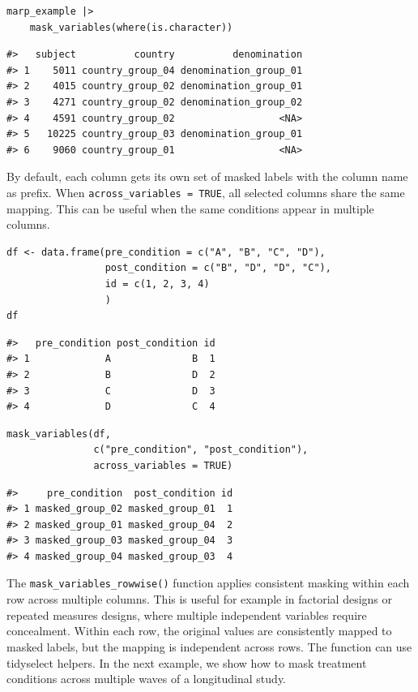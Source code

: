 \begin{verbatim}
marp_example |> 
    mask_variables(where(is.character))
\end{verbatim}

\begin{verbatim}
#>   subject          country          denomination
#> 1    5011 country_group_04 denomination_group_01
#> 2    4015 country_group_02 denomination_group_01
#> 3    4271 country_group_02 denomination_group_02
#> 4    4591 country_group_02                  <NA>
#> 5   10225 country_group_03 denomination_group_01
#> 6    9060 country_group_01                  <NA>
\end{verbatim}

By default, each column gets its own set of masked labels with the column name as prefix. When \texttt{across\_variables\ =\ TRUE}, all selected columns share the same mapping. This can be useful when the same conditions appear in multiple columns.

\begin{verbatim}
df <- data.frame(pre_condition = c("A", "B", "C", "D"),
                 post_condition = c("B", "D", "D", "C"),
                 id = c(1, 2, 3, 4)
                 )
df
\end{verbatim}

\begin{verbatim}
#>   pre_condition post_condition id
#> 1             A              B  1
#> 2             B              D  2
#> 3             C              D  3
#> 4             D              C  4
\end{verbatim}

\begin{verbatim}
mask_variables(df, 
               c("pre_condition", "post_condition"),
               across_variables = TRUE)
\end{verbatim}

\begin{verbatim}
#>     pre_condition  post_condition id
#> 1 masked_group_02 masked_group_01  1
#> 2 masked_group_01 masked_group_04  2
#> 3 masked_group_03 masked_group_04  3
#> 4 masked_group_04 masked_group_03  4
\end{verbatim}

The \texttt{mask\_variables\_rowwise()} function applies consistent masking within each row across multiple columns. This is useful for example in factorial designs or repeated measures designs, where multiple independent variables require concealment. Within each row, the original values are consistently mapped to masked labels, but the mapping is independent across rows. The function can use tidyselect helpers. In the next example, we show how to mask treatment conditions across multiple waves of a longitudinal study.

